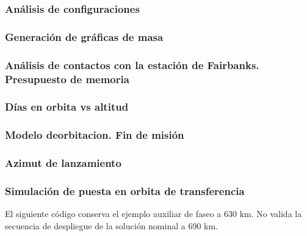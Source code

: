 \newpage
\subsubsection{Análisis de configuraciones}


\newpage
\subsubsection{Generación de gráficas de masa}


\newpage
\subsubsection{Análisis de contactos con la estación de Fairbanks. Presupuesto de memoria}


\newpage
\subsubsection{Días en orbita vs altitud}


\newpage
\subsubsection{Modelo deorbitacion. Fin de misión}


\newpage
\subsubsection{Azimut de lanzamiento}


\newpage
\subsubsection{Simulación de puesta en orbita de transferencia}
El siguiente código conserva el ejemplo auxiliar de faseo a 630 km. No valida la secuencia de despliegue de la solución nominal a 690 km.


